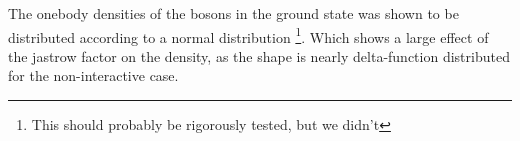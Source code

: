 The onebody densities of the bosons in the ground state was shown to be distributed according to a normal distribution  \footnote{This should probably be rigorously tested, but we didn't}. Which shows a large effect of the jastrow factor on the density, as the shape is nearly delta-function distributed for the non-interactive case. 
